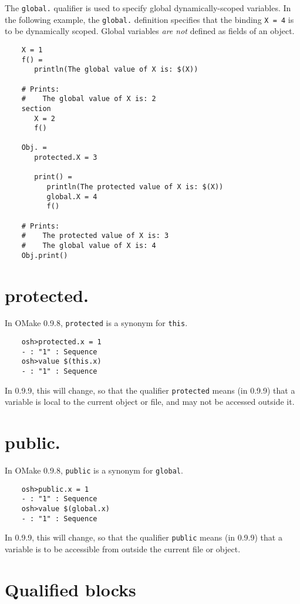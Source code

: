 The \verb+global.+ qualifier is used to specify global dynamically-scoped variables.  In the following
example, the \verb+global.+ definition specifies that the binding \verb+X = 4+ is to be dynamically
scoped.  Global variables \emph{are not} defined as fields of an object.

\begin{verbatim}
    X = 1
    f() =
       println(The global value of X is: $(X))

    # Prints:
    #    The global value of X is: 2
    section
       X = 2
       f()

    Obj. =
       protected.X = 3

       print() =
          println(The protected value of X is: $(X))
          global.X = 4
          f()

    # Prints:
    #    The protected value of X is: 3
    #    The global value of X is: 4
    Obj.print()
\end{verbatim}

\section{protected.}
\label{section:protected}

In OMake 0.9.8, \verb+protected+ is a synonym for \verb+this+.

\begin{verbatim}
    osh>protected.x = 1
    - : "1" : Sequence
    osh>value $(this.x)
    - : "1" : Sequence
\end{verbatim}
%
In 0.9.9, this will change, so that the qualifier \verb+protected+ means (in 0.9.9) that a variable
is local to the current object or file, and may not be accessed outside it.

\section{public.}
\label{section:public}

In OMake 0.9.8, \verb+public+ is a synonym for \verb+global+.

\begin{verbatim}
    osh>public.x = 1
    - : "1" : Sequence
    osh>value $(global.x)
    - : "1" : Sequence
\end{verbatim}
%
In 0.9.9, this will change, so that the qualifier \verb+public+ means (in 0.9.9) that a variable
is to be accessible from outside the current file or object.

\section{Qualified blocks}

